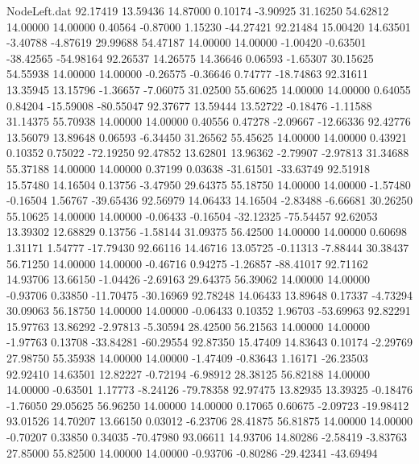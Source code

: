\begin{filecontents}{NodeLeft.dat}
  92.17419   13.59436   14.87000     0.10174   -3.90925   31.16250   54.62812   14.00000   14.00000    0.40564   -0.87000    1.15230  -44.27421
  92.21484   15.00420   14.63501    -3.40788   -4.87619   29.99688   54.47187   14.00000   14.00000   -1.00420   -0.63501  -38.42565  -54.98164
  92.26537   14.26575   14.36646     0.06593   -1.65307   30.15625   54.55938   14.00000   14.00000   -0.26575   -0.36646    0.74777  -18.74863
  92.31611   13.35945   13.15796    -1.36657   -7.06075   31.02500   55.60625   14.00000   14.00000    0.64055    0.84204  -15.59008  -80.55047
  92.37677   13.59444   13.52722    -0.18476   -1.11588   31.14375   55.70938   14.00000   14.00000    0.40556    0.47278   -2.09667  -12.66336
  92.42776   13.56079   13.89648     0.06593   -6.34450   31.26562   55.45625   14.00000   14.00000    0.43921    0.10352    0.75022  -72.19250
  92.47852   13.62801   13.96362    -2.79907   -2.97813   31.34688   55.37188   14.00000   14.00000    0.37199    0.03638  -31.61501  -33.63749
  92.51918   15.57480   14.16504     0.13756   -3.47950   29.64375   55.18750   14.00000   14.00000   -1.57480   -0.16504    1.56767  -39.65436
  92.56979   14.06433   14.16504    -2.83488   -6.66681   30.26250   55.10625   14.00000   14.00000   -0.06433   -0.16504  -32.12325  -75.54457
  92.62053   13.39302   12.68829     0.13756   -1.58144   31.09375   56.42500   14.00000   14.00000    0.60698    1.31171    1.54777  -17.79430
  92.66116   14.46716   13.05725    -0.11313   -7.88444   30.38437   56.71250   14.00000   14.00000   -0.46716    0.94275   -1.26857  -88.41017
  92.71162   14.93706   13.66150    -1.04426   -2.69163   29.64375   56.39062   14.00000   14.00000   -0.93706    0.33850  -11.70475  -30.16969
  92.78248   14.06433   13.89648     0.17337   -4.73294   30.09063   56.18750   14.00000   14.00000   -0.06433    0.10352    1.96703  -53.69963
  92.82291   15.97763   13.86292    -2.97813   -5.30594   28.42500   56.21563   14.00000   14.00000   -1.97763    0.13708  -33.84281  -60.29554
  92.87350   15.47409   14.83643     0.10174   -2.29769   27.98750   55.35938   14.00000   14.00000   -1.47409   -0.83643    1.16171  -26.23503
  92.92410   14.63501   12.82227    -0.72194   -6.98912   28.38125   56.82188   14.00000   14.00000   -0.63501    1.17773   -8.24126  -79.78358
  92.97475   13.82935   13.39325    -0.18476   -1.76050   29.05625   56.96250   14.00000   14.00000    0.17065    0.60675   -2.09723  -19.98412
  93.01526   14.70207   13.66150     0.03012   -6.23706   28.41875   56.81875   14.00000   14.00000   -0.70207    0.33850    0.34035  -70.47980
  93.06611   14.93706   14.80286    -2.58419   -3.83763   27.85000   55.82500   14.00000   14.00000   -0.93706   -0.80286  -29.42341  -43.69494

\end{filecontents}
